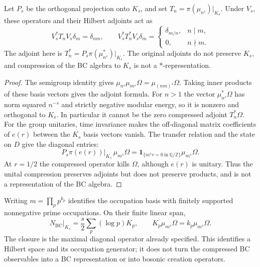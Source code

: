 \begin{proposition}
\label{v4-arith:consumer53:BC-compression}
Let $P_s$ be the orthogonal projection onto $K_s$, and set
$T_n=\pi(\mu_{n^s})|_{K_s}$. Under $V_s$, these operators and their
Hilbert adjoints act as
\[
 V_s^*T_nV_s\delta_m=\delta_{nm},\qquad
 V_s^*T_n^*V_s\delta_m=
 \begin{cases}\delta_{m/n},&n\mid m,\\0,&n\nmid m.\end{cases}
\]
The adjoint here is $T_n^*=P_s\pi(\mu_{n^s}^*)|_{K_s}$.
The original adjoints do not preserve $K_s$, and compression of the
BC algebra to $K_s$ is not a $*$-representation.
\end{proposition}
\begin{proof}
The semigroup identity gives
$\mu_{n^s}\mu_{m^s}\Omega=\mu_{(nm)^s}\Omega$.
Taking inner products of these basis vectors gives the adjoint formula.
For $n>1$ the vector $\mu_{n^s}^*\Omega$ has norm squared $n^{-s}$
and strictly negative modular energy, so it is nonzero and orthogonal
to $K_s$. In particular it cannot be the zero compressed adjoint
$T_n^*\Omega$.
For the group unitaries, time invariance makes the off-diagonal
matrix coefficients of $e(r)$ between the $K_s$ basis vectors vanish.
The transfer relation and the state on $D$ give the diagonal entries:
\[
 P_s\pi(e(r))|_{K_s}\,\mu_{m^s}\Omega
   =\mathbf1_{\{m^s r=0\ \mathrm{in}\ \mathbb Q/\mathbb Z\}}
       \mu_{m^s}\Omega.
\]
At $r=1/2$ the compressed operator kills $\Omega$, although $e(r)$
is unitary. Thus the unital compression preserves adjoints but does not preserve
products, and is not a representation of the BC algebra.
\end{proof}
Writing $m=\prod_p p^{k_p}$ identifies the occupation basis with
finitely supported nonnegative prime occupations. On their finite
linear span,
\[
 N_{\mathrm{BC}}|_{K_s}=\frac s2\sum_p(\log p)K_p,
 \qquad K_p\mu_{m^s}\Omega=k_p\mu_{m^s}\Omega.
\]
The closure is the maximal diagonal operator already specified.
This identifies a Hilbert space and its occupation generator; it
does not turn the compressed BC observables into a BC representation
or into bosonic creation operators.

